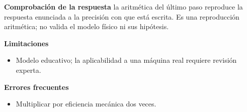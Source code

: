 \documentclass[10pt,openany]{book}
\begin{document}
\begin{tcolorbox}[title={Problema resuelto 4}, studiumworked, breakable]
\noindent\textbf{Comprobación de la respuesta} la aritmética del último paso reproduce la respuesta enunciada a la precisión con que está escrita. Es una reproducción aritmética; no valida el modelo físico ni sus hipótesis.

\noindent\textbf{Limitaciones}
\begin{itemize}
\item Modelo educativo; la aplicabilidad a una máquina real requiere revisión experta.
\end{itemize}

\noindent\textbf{Errores frecuentes}
\begin{itemize}
\item Multiplicar por eficiencia mecánica dos veces.
\end{itemize}
\end{tcolorbox}
\end{document}
